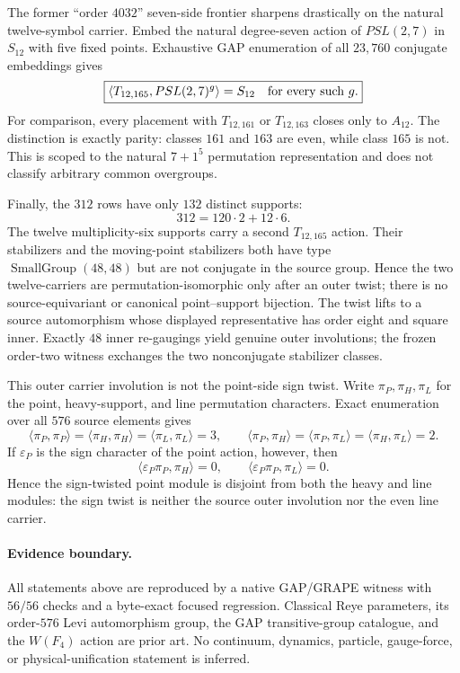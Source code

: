 The former ``order $4032$'' seven-side frontier sharpens drastically on the
natural twelve-symbol carrier.  Embed the natural degree-seven action of
$PSL(2,7)$ in $S_{12}$ with five fixed points.  Exhaustive GAP enumeration of
all $23{,}760$ conjugate embeddings gives
\[
 \boxed{\langle T_{12,165},PSL(2,7)^g\rangle=S_{12}
        \quad\hbox{for every such }g.}
\]
For comparison, every placement with $T_{12,161}$ or $T_{12,163}$ closes only
to $A_{12}$.  The distinction is exactly parity: classes $161$ and $163$ are
even, while class $165$ is not.  This is scoped to the natural $7+1^5$
permutation representation and does not classify arbitrary common overgroups.

Finally, the $312$ rows have only $132$ distinct supports:
\[
 312=120\cdot2+12\cdot6.
\]
The twelve multiplicity-six supports carry a second $T_{12,165}$ action.  Their
stabilizers and the moving-point stabilizers both have type
$\operatorname{SmallGroup}(48,48)$ but are not conjugate in the source group.
Hence the two twelve-carriers are permutation-isomorphic only after an outer
twist; there is no source-equivariant or canonical point--support bijection.
The twist lifts to a source automorphism whose displayed representative has
order eight and square inner.  Exactly $48$ inner re-gaugings yield genuine
outer involutions; the frozen order-two witness exchanges the two nonconjugate
stabilizer classes.

This outer carrier involution is not the point-side sign twist.  Write
$\pi_P,\pi_H,\pi_L$ for the point, heavy-support, and line permutation
characters.  Exact enumeration over all $576$ source elements gives
\[
 \langle\pi_P,\pi_P\rangle
 =\langle\pi_H,\pi_H\rangle
 =\langle\pi_L,\pi_L\rangle=3,
 \qquad
 \langle\pi_P,\pi_H\rangle
 =\langle\pi_P,\pi_L\rangle
 =\langle\pi_H,\pi_L\rangle=2.
\]
If $\varepsilon_P$ is the sign character of the point action, however, then
\[
 \boxed{\langle\varepsilon_P\pi_P,\pi_H\rangle=0,
        \qquad
        \langle\varepsilon_P\pi_P,\pi_L\rangle=0.}
\]
Hence the sign-twisted point module is disjoint from both the heavy and line
modules: the sign twist is neither the source outer involution nor the even
line carrier.

\paragraph{Evidence boundary.}
All statements above are reproduced by a native GAP/GRAPE witness with $56/56$
checks and a byte-exact focused regression.  Classical Reye parameters, its
order-$576$ Levi automorphism group, the GAP transitive-group catalogue, and the
$W(F_4)$ action are prior art.  No continuum, dynamics, particle, gauge-force,
or physical-unification statement is inferred.
